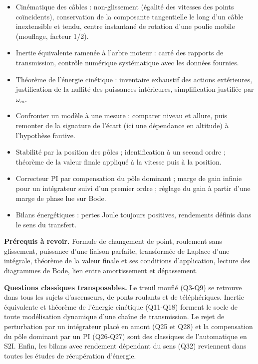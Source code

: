 \documentclass[11pt,a4paper]{article}
\providecommand{\tightlist}{\setlength{\itemsep}{0pt}\setlength{\parskip}{0pt}}
\begin{document}
\begin{itemize}
\tightlist
\item
  Cinématique des câbles : non-glissement (égalité des vitesses des points coïncidents), conservation de la composante tangentielle le long d'un câble inextensible et tendu, centre instantané de rotation d'une poulie mobile (mouflage, facteur 1/2).
\item
  Inertie équivalente ramenée à l'arbre moteur : carré des rapports de transmission, contrôle numérique systématique avec les données fournies.
\item
  Théorème de l'énergie cinétique : inventaire exhaustif des actions extérieures, justification de la nullité des puissances intérieures, simplification justifiée par \(\omega_m\).
\item
  Confronter un modèle à une mesure : comparer niveau et allure, puis remonter de la signature de l'écart (ici une dépendance en altitude) à l'hypothèse fautive.
\item
  Stabilité par la position des pôles ; identification à un second ordre ; théorème de la valeur finale appliqué à la vitesse puis à la position.
\item
  Correcteur PI par compensation du pôle dominant ; marge de gain infinie pour un intégrateur suivi d'un premier ordre ; réglage du gain à partir d'une marge de phase lue sur Bode.
\item
  Bilans énergétiques : pertes Joule toujours positives, rendements définis dans le sens du transfert.
\end{itemize}

\textbf{Prérequis à revoir.} Formule de changement de point, roulement sans glissement, puissance d'une liaison parfaite, transformée de Laplace d'une intégrale, théorème de la valeur finale et ses conditions d'application, lecture des diagrammes de Bode, lien entre amortissement et dépassement.

\textbf{Questions classiques transposables.} Le treuil mouflé (Q3-Q9) se retrouve dans tous les sujets d'ascenseurs, de ponts roulants et de téléphériques. Inertie équivalente et théorème de l'énergie cinétique (Q11-Q18) forment le socle de toute modélisation dynamique d'une chaîne de transmission. Le rejet de perturbation par un intégrateur placé en amont (Q25 et Q28) et la compensation du pôle dominant par un PI (Q26-Q27) sont des classiques de l'automatique en S2I. Enfin, les bilans avec rendement dépendant du sens (Q32) reviennent dans toutes les études de récupération d'énergie.
\end{document}
